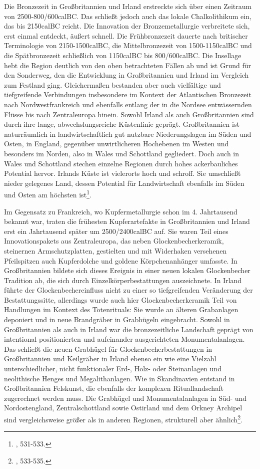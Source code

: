 \documentclass[openany,twoside,twocolumn]{book}
\let\rmarkdownfootnote\footnote%
\def\footnote{\protect\rmarkdownfootnote}
\begin{document}
Die Bronzezeit in Großbritannien und Irland erstreckte sich über einen
Zeitraum von 2500-800/600calBC. Das schließt jedoch auch das lokale
Chalkolithikum ein, das bis 2150calBC reicht. Die Innovation der
Bronzemetallurgie verbreitete sich, erst einmal entdeckt, äußert
schnell. Die Frühbronzezeit dauerte nach britischer Terminologie von
2150-1500calBC, die Mittelbronzezeit von 1500-1150calBC und die
Spätbronzezeit schließlich von 1150calBC bis 800/600calBC. Die Insellage
hebt die Region deutlich von den oben betrachteten Fällen ab und ist
Grund für den Sonderweg, den die Entwicklung in Großbritannien und
Irland im Vergleich zum Festland ging. Gleichermaßen bestanden aber auch
vielfältige und tiefgreifende Verbindungen insbesondere im Kontext der
Atlantischen Bronzezeit nach Nordwestfrankreich und ebenfalls entlang
der in die Nordsee entwässernden Flüsse bis nach Zentraleuropa hinein.
Sowohl Irland als auch Großbritannien sind durch ihre lange,
abwechslungsreiche Küstenlinie geprägt. Großbritannien ist naturräumlich
in landwirtschaftlich gut nutzbare Niederungslagen im Süden und Osten,
in England, gegenüber unwirtlicheren Hochebenen im Westen und besonders
im Norden, also in Wales und Schottland gegliedert. Doch auch in Wales
und Schottland stechen einzelne Regionen durch hohes ackerbauliches
Potential hervor. Irlands Küste ist vielerorts hoch und schroff. Sie
umschließt nieder gelegenes Land, dessen Potential für Landwirtschaft
ebenfalls im Süden und Osten am höchsten ist\footnote{\textcite{roberts_britain_2013},
  531-533.}.

Im Gegensatz zu Frankreich, wo Kupfermetallurgie schon im 4. Jahrtausend
bekannt war, traten die frühesten Kupferartefakte in Großbritannien und
Irland erst ein Jahrtausend später um 2500/2400calBC auf. Sie waren Teil
eines Innovationspakets aus Zentraleuropa, das neben
Glockenbecherkeramik, steinernen Armschutzplatten, gestielten und mit
Widerhaken versehenen Pfeilspitzen auch Kupferdolche und goldene
Körpchenanhänger umfasste. In Großbritannien bildete sich dieses
Ereignis in einer neuen lokalen Glockenbecher Tradition ab, die sich
durch Einzelkörperbestattungen auszeichnete. In Irland führte der
Glockenbechereinfluss nicht zu einer so tiefgreifenden Veränderung der
Bestattungssitte, allerdings wurde auch hier Glockenbecherkeramik Teil
von Handlungen im Kontext des Totenrituals: Sie wurde an älteren
Grabanlagen deponiert und in neue Brandgräber in Grabhügeln eingebracht.
Sowohl in Großbritannien als auch in Irland war die bronzezeitliche
Landschaft geprägt von intentional positionierten und aufeinander
ausgerichteten Monumentalanlagen. Das schließt die neuen Grabhügel für
Glockenbecherbestattungen in Großbritannien und Keilgräber in Irland
ebenso ein wie eine Vielzahl unterschiedlicher, nicht funktionaler Erd-,
Holz- oder Steinanlagen und neolithische Henges und Megalithanlagen. Wie
in Skandinavien entstand in Großbritannien Felskunst, die ebenfalls der
komplexen Rituallandschaft zugerechnet werden muss. Die Grabhügel und
Monumentalanlagen in Süd- und Nordostengland, Zentralschottland sowie
Ostirland und dem Orkney Archipel sind vergleichsweise größer als in
anderen Regionen, strukturell aber ähnlich\footnote{\textcite{roberts_britain_2013},
  533-535.}.
\end{document}
